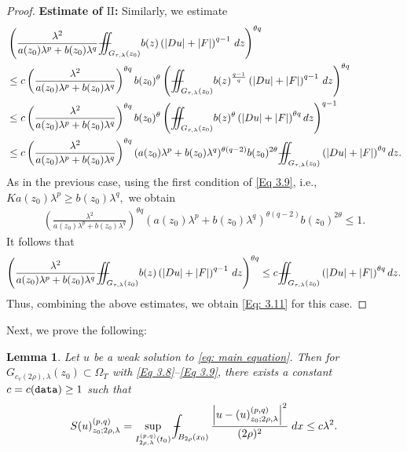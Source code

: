 \documentclass[11pt,oneside, english,reqno,twoside a4paper]{amsart}
\newtheorem{lemma}{Lemma}[section]
\theoremstyle{definition}
\numberwithin{theorem}{section}
\numberwithin{equation}{section}
\def\Xint#1{\mathchoice
	{\XXint\displaystyle\textstyle{#1}}%
	{\XXint\textstyle\scriptstyle{#1}}%
	{\XXint\scriptstyle\scriptscriptstyle{#1}}%
	{\XXint\scriptscriptstyle\scriptscriptstyle{#1}}%
	\!\int}
\def\XXint#1#2#3{{\setbox0=\hbox{$#1{#2#3}{\int}$}
		\vcenter{\hbox{$#2#3$}}\kern-.50\wd0}}
\def\dashint{\Xint-}
\newcommand{\iintss}{{\int\hspace{-0.28cm}\int}}
\newcommand{ \miints }{{\iintss\hspace{-0.56cm} -\hspace{-0.15cm}-}}
\newcommand{\miint}[1]{{\miints_{\hspace{-0.13cm}#1}}}
\begin{document}
\begin{proof}
\noindent \textbf{Estimate of $\mathrm{II}$:} Similarly, we estimate
\begin{align*}
&\left(\frac{\lambda^2}{a(z_0)\lambda^p+b(z_0)\lambda^q}\miint{G_{\tau, \lambda}(z_0)}b(z)\left(|Du|+|F|\right)^{q-1}\,dz\right)^{\theta q}\\
&\leq c\left(\frac{\lambda^2}{a(z_0)\lambda^p+b(z_0)\lambda^q}\right)^{\theta q}b(z_0)^{\theta}\left(\miint{G_{\tau, \lambda}(z_0)}b(z)^{\frac{q-1}{q}}\left(|Du|+|F|\right)^{q-1}\, dz\right)^{\theta q}\\
&\leq c \left(\frac{\lambda^2}{a(z_0)\lambda^p+b(z_0)\lambda^q}\right)^{\theta q}b(z_0)^{\theta}\left(\miint{G_{\tau, \lambda}(z_0)}b(z)^{\theta}\left(|Du|+|F|\right)^{\theta q}dz\right)^{q-1}\\
&\leq c \left(\frac{\lambda^2}{a(z_0)\lambda^p+b(z_0)\lambda^q}\right)^{\theta q}(a(z_0)\lambda^p+b(z_0)\lambda^q)^{\theta (q-2)}b(z_0)^{2\theta} \miint{G_{\tau, \lambda}(z_0)} \left(|Du|+|F|\right)^{\theta q}dz.
\end{align*}
As in the previous case, using the first condition of \eqref{Eq 3.9}, i.e., $Ka(z_0)\lambda^p\geq b(z_0)\lambda^q,$ we obtain
\begin{align*}
 \left(\frac{\lambda^2}{a(z_0)\lambda^p+b(z_0)\lambda^q}\right)^{\theta q}(a(z_0)\lambda^p+b(z_0)\lambda^q)^{\theta (q-2)}b(z_0)^{2\theta} \leq 1.   
\end{align*}
It follows that
\begin{align*}
    \left(\frac{\lambda^2}{a(z_0)\lambda^p+b(z_0)\lambda^q}\miint{G_{\tau, \lambda}(z_0)}b(z)\left(|Du|+|F|\right)^{q-1}\,dz\right)^{\theta q} \leq c \miint{G_{\tau, \lambda}(z_0)} \left(|Du|+|F|\right)^{\theta q} dz.
\end{align*}
Thus, combining the above estimates, we obtain \eqref{Eq: 3.11} for this case.
\end{proof}
Next, we prove the following:
\begin{lemma}\label{Lemma 3.14}
Let $u$ be a weak solution to \eqref{eq: main equation}. Then for $G_{c_v(2 \rho),\lambda}(z_0) \subset \Omega_T$ with \eqref{Eq 3.8}--\eqref{Eq 3.9}, there exists a constant $c=c(\textnormal{\texttt{data}}) \geq 1$ such that
\begin{align*}
S(u)^{(p,q)}_{z_0 ; 2 \rho,\lambda}=\sup _{I^{(p,q)}_{2 \rho,\lambda}(t_0)} \dashint_{B_{2 \rho}(x_0)} \frac{\left|u-(u)^{(p,q)}_{z_0 ; 2 \rho,\lambda}\right|^2}{(2 \rho)^2}\; dx \leq c \lambda^2 .
\end{align*}
\end{lemma}
\end{document}
